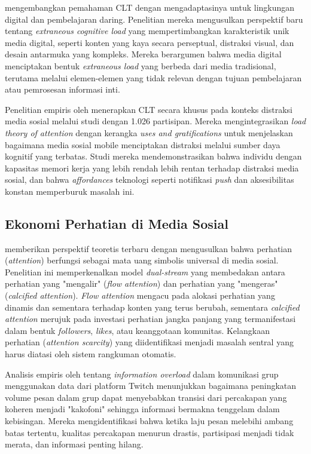 \textcite{skulmowski2022} mengembangkan pemahaman CLT dengan mengadaptasinya untuk lingkungan digital dan pembelajaran daring. Penelitian mereka mengusulkan perspektif baru tentang \textit{extraneous cognitive load} yang mempertimbangkan karakteristik unik media digital, seperti konten yang kaya secara perseptual, distraksi visual, dan desain antarmuka yang kompleks. Mereka berargumen bahwa media digital menciptakan bentuk \textit{extraneous load} yang berbeda dari media tradisional, terutama melalui elemen-elemen yang tidak relevan dengan tujuan pembelajaran atau pemrosesan informasi inti.

Penelitian empiris oleh \textcite{sidnammauch2024} menerapkan CLT secara khusus pada konteks distraksi media sosial melalui studi dengan 1.026 partisipan. Mereka mengintegrasikan \textit{load theory of attention} dengan kerangka \textit{uses and gratifications} untuk menjelaskan bagaimana media sosial mobile menciptakan distraksi melalui sumber daya kognitif yang terbatas. Studi mereka mendemonstrasikan bahwa individu dengan kapasitas memori kerja yang lebih rendah lebih rentan terhadap distraksi media sosial, dan bahwa \textit{affordances} teknologi seperti notifikasi \textit{push} dan aksesibilitas konstan memperburuk masalah ini.

\subsection{Ekonomi Perhatian di Media Sosial}

\textcite{heitmayer2025} memberikan perspektif teoretis terbaru dengan mengusulkan bahwa perhatian (\textit{attention}) berfungsi sebagai mata uang simbolis universal di media sosial. Penelitian ini memperkenalkan model \textit{dual-stream} yang membedakan antara perhatian yang "mengalir" (\textit{flow attention}) dan perhatian yang "mengeras" (\textit{calcified attention}). \textit{Flow attention} mengacu pada alokasi perhatian yang dinamis dan sementara terhadap konten yang terus berubah, sementara \textit{calcified attention} merujuk pada investasi perhatian jangka panjang yang termanifestasi dalam bentuk \textit{followers}, \textit{likes}, atau keanggotaan komunitas. Kelangkaan perhatian (\textit{attention scarcity}) yang diidentifikasi menjadi masalah sentral yang harus diatasi oleh sistem rangkuman otomatis.

Analisis empiris oleh \textcite{nematzadeh2019} tentang \textit{information overload} dalam komunikasi grup menggunakan data dari platform Twitch menunjukkan bagaimana peningkatan volume pesan dalam grup dapat menyebabkan transisi dari percakapan yang koheren menjadi "kakofoni" sehingga informasi bermakna tenggelam dalam kebisingan. Mereka mengidentifikasi bahwa ketika laju pesan melebihi ambang batas tertentu, kualitas percakapan menurun drastis, partisipasi menjadi tidak merata, dan informasi penting hilang.


